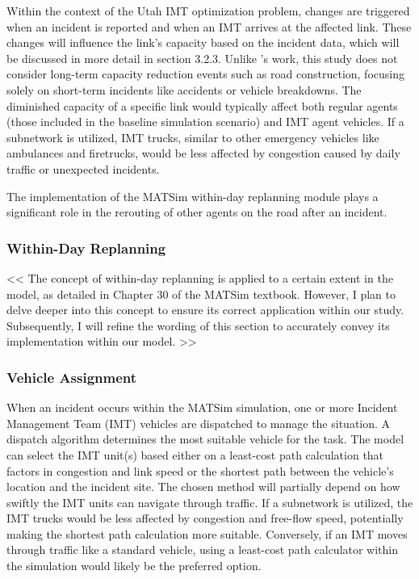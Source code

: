 \documentclass[
  letterpaper,
  authoryear]{elsarticle}
\begin{document}
Within the context of the Utah IMT optimization problem, changes are
triggered when an incident is reported and when an IMT arrives at the
affected link. These changes will influence the link's capacity based on
the incident data, which will be discussed in more detail in section
3.2.3. Unlike \citet{kaddoura2016}'s work, this study does not consider
long-term capacity reduction events such as road construction, focusing
solely on short-term incidents like accidents or vehicle breakdowns. The
diminished capacity of a specific link would typically affect both
regular agents (those included in the baseline simulation scenario) and
IMT agent vehicles. If a subnetwork is utilized, IMT trucks, similar to
other emergency vehicles like ambulances and firetrucks, would be less
affected by congestion caused by daily traffic or unexpected incidents.

The implementation of the MATSim within-day replanning module plays a
significant role in the rerouting of other agents on the road after an
incident.

\hypertarget{within-day-replanning}{%
\subsubsection{Within-Day Replanning}\label{within-day-replanning}}

\textless\textless{} The concept of within-day replanning is applied to
a certain extent in the model, as detailed in Chapter 30 of the MATSim
textbook. However, I plan to delve deeper into this concept to ensure
its correct application within our study. Subsequently, I will refine
the wording of this section to accurately convey its implementation
within our model. \textgreater\textgreater{}

\hypertarget{vehicle-assignment}{%
\subsubsection{Vehicle Assignment}\label{vehicle-assignment}}

When an incident occurs within the MATSim simulation, one or more
Incident Management Team (IMT) vehicles are dispatched to manage the
situation. A dispatch algorithm determines the most suitable vehicle for
the task. The model can select the IMT unit(s) based either on a
least-cost path calculation that factors in congestion and link speed or
the shortest path between the vehicle's location and the incident site.
The chosen method will partially depend on how swiftly the IMT units can
navigate through traffic. If a subnetwork is utilized, the IMT trucks
would be less affected by congestion and free-flow speed, potentially
making the shortest path calculation more suitable. Conversely, if an
IMT moves through traffic like a standard vehicle, using a least-cost
path calculator within the simulation would likely be the preferred
option.
\end{document}
